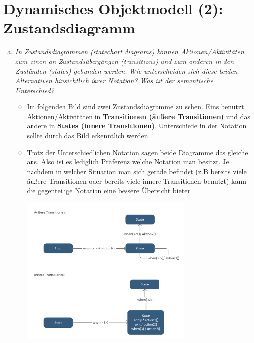 \section{Dynamisches Objektmodell (2): Zustandsdiagramm}
\begin{enumerate}[(a)]
    \item {\itshape In Zustandsdiagrammen (statechart diagrams) können Aktionen/Aktivitäten zum einen an Zustandsübergängen (transitions) und zum anderen in den Zuständen (states) gebunden werden. Wie unterscheiden sich diese beiden Alternativen hinsichtlich ihrer Notation? Was ist der semantische Unterschied?}
    \begin{itemize}
        \item Im folgenden Bild sind zwei Zustandsdiagramme zu sehen. Eins benutzt Aktionen/Aktivitäten in \textbf{Transitionen (äußere Transitionen)} und das andere in \textbf{States (innere Transitionen)}. Unterschiede in der Notation sollte durch das Bild erkenntlich werden. 
        \item Trotz der Unterschiedlichen Notation sagen beide Diagramme das gleiche aus. Also ist es lediglich Präferenz welche Notation man besitzt. Je nachdem in welcher Situation man sich gerade befindet (z.B bereits viele äußere Transitionen oder bereits viele innere Transitionen benutzt) kann die gegenteilige Notation eine bessere Übersicht bieten
        
        \includegraphics[width=0.7\textwidth]{src/u6/U6_3a.png}
        
    \end{itemize}
    

\end{enumerate}
